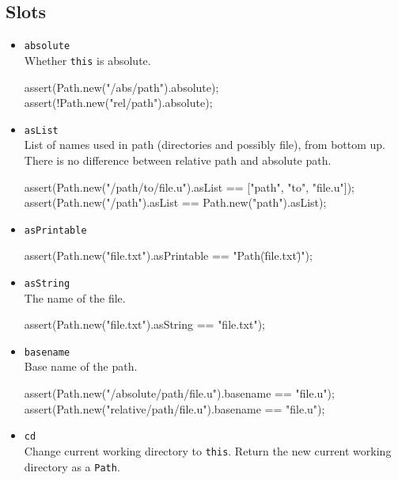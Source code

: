 \subsection{Slots}
\begin{itemize}
\item \lstinline|absolute|\\
  Whether \lstinline|this| is absolute.
\begin{urbiscript}[firstnumber=last]
assert(Path.new("/abs/path").absolute);
assert(!Path.new("rel/path").absolute);
\end{urbiscript}

\item \lstinline|asList|\\
  List of names used in path (directories and possibly file), from
  bottom up. There is no difference between relative path and absolute
  path.
\begin{urbiscript}[firstnumber=last]
assert(Path.new("/path/to/file.u").asList == ["path", "to", "file.u"]);
assert(Path.new("/path").asList           == Path.new("path").asList);
\end{urbiscript}

\item \lstinline|asPrintable|\\
\begin{urbiscript}[firstnumber=last]
assert(Path.new("file.txt").asPrintable == "Path(\"file.txt\")");
\end{urbiscript}

\item \lstinline|asString|\\
  The name of the file.
\begin{urbiscript}[firstnumber=last]
assert(Path.new("file.txt").asString == "file.txt");
\end{urbiscript}

\item \lstinline|basename|\\
  Base name of the path.
\begin{urbiscript}[firstnumber=last]
assert(Path.new("/absolute/path/file.u").basename == "file.u");
assert(Path.new("relative/path/file.u").basename  == "file.u");
\end{urbiscript}

\item \lstinline|cd|\\
  Change current working directory to \lstinline|this|. Return the new
  current working directory as a \lstinline|Path|.


\end{itemize}
